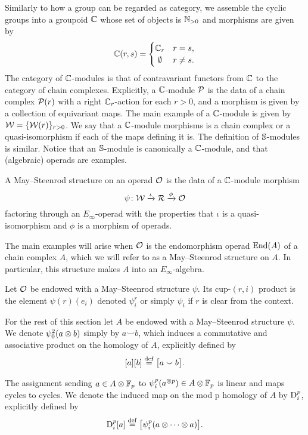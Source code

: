 Similarly to how a group can be regarded as category, we assemble the cyclic groups into a groupoid $\mathbb{C}$ whose set of objects is $\mathbb{N}_{>0}$ and morphisms are given by
\[
\cyc(r,s) =
\begin{cases}
	\cyc_r & r = s, \\
	\hfil \emptyset & r \neq s.
\end{cases}
\]
The category of $\mathbb{C}$-modules is that of contravariant functors from $\mathbb{C}$ to the category of chain complexes.
Explicitly, a $\mathbb{C}$-module $\mathcal{P}$ is the data of a chain complex $\mathcal{P}(r)$ with a right $\mathbb{C}_r$-action for each $r > 0$, and a morphism is given by a collection of equivariant maps.
The main example of a $\mathbb{C}$-module is given by $\mathcal{W} = \{\mathcal{W}(r)\}_{r>0}$.
We say that a $\mathbb{C}$-module morphisms is a chain complex or a quasi-isomorphism if each of the maps defining it is.
The definition of $\mathbb{S}$-modules is similar.
Notice that an $\mathbb{S}$-module is canonically a $\mathbb{C}$-module, and that (algebraic) operads are examples.

\sssec

A May--Steenrod structure on an operad $\mathcal{O}$ is the data of a $\mathbb{C}$-module morphism
\[
\psi \colon \mathcal{W} \xrightarrow{\iota} \mathcal{R} \xrightarrow{\phi} \mathcal{O}
\]
factoring through an $E_\infty$-operad with the properties that $\iota$ is a quasi-isomorphism and $\phi$ is a morphism of operads.

The main examples will arise when $\mathcal{O}$ is the endomorphism operad $\mathrm{End}(A)$ of a chain complex $A$, which we will refer to as a May--Steenrod structure on $A$.
In particular, this structure makes $A$ into an $E_\infty$-algebra.

\sssec

Let $\mathcal{O}$ be endowed with a May--Steenrod structure $\psi$.
Its cup-$(r,i)$ product
is the element $\psi(r)(e_i)$ denoted $\psi_i^r$ or simply $\psi_i$ if $r$ is clear from the context.

\sssec

For the rest of this section let $A$ be endowed with a May--Steenrod structure $\psi$.
We denote $\psi_0^2(a \otimes b)$ simply by $a \smallsmile b$, which induces a commutative and associative product on the homology of $A$, explicitly defined by
\[
[a][b] \stackrel{\mathrm{def}}{=} \big[a \smallsmile b\big].
\]

\sssec

The assignment sending $a \in A \otimes {\mathbb{F}_p}$ to $\psi_i^p(a^{\otimes p}) \in A \otimes {\mathbb{F}_p}$ is linear and maps cycles to cycles.
We denote the induced map on the mod p homology of $A$ by $\mathrm{D}_i^p$, explicitly defined by
\[
\mathrm{D}_i^p[a] \stackrel{\mathrm{def}}{=} \big[\psi_i^p(a \otimes\dotsb\otimes a)\big].
\]

